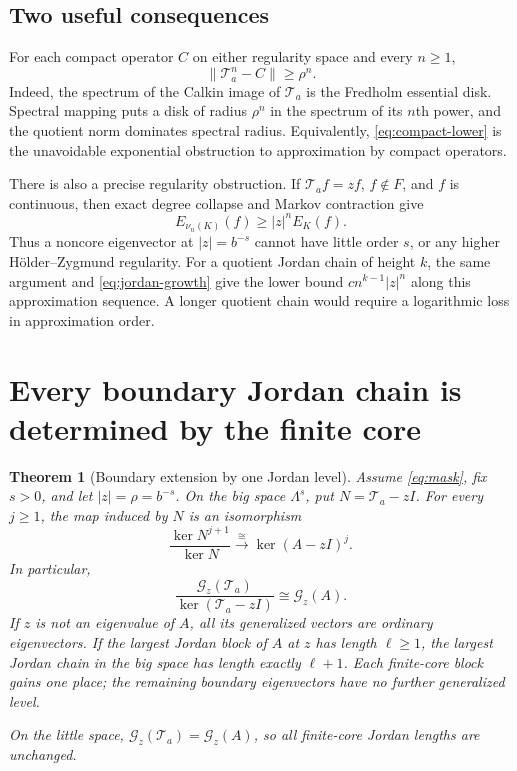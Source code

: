 \documentclass[11pt,a4paper]{article}
\numberwithin{equation}{section}
\newtheorem{theorem}{Theorem}[section]
\theoremstyle{definition}
\theoremstyle{remark}
\newcommand{\Ta}{\mathcal T_a}
\newcommand{\norm}[1]{\left\lVert#1\right\rVert}
\newcommand{\Gg}[2]{\mathcal G_{#1}(#2)}
\begin{document}
\subsection{Two useful consequences}
For each compact operator $C$ on either regularity space and every
$n\ge1$,
\begin{equation}
 \norm{\Ta^n-C}\ge\rho^n.
 \label{eq:compact-lower}
\end{equation}
Indeed, the spectrum of the Calkin image of $\Ta$ is the Fredholm
essential disk. Spectral mapping puts a disk of radius $\rho^n$ in the
spectrum of its $n$th power, and the quotient norm dominates spectral
radius. Equivalently, \eqref{eq:compact-lower} is the unavoidable
exponential obstruction to approximation by compact operators.

There is also a precise regularity obstruction. If $\Ta f=zf$,
$f\notin F$, and $f$ is continuous, then exact degree collapse and
Markov contraction give
\begin{equation}
 E_{\nu_n(K)}(f)\ge |z|^n E_K(f).
 \label{eq:sharp-approx-lower}
\end{equation}
Thus a noncore eigenvector at $|z|=b^{-s}$ cannot have little order
$s$, or any higher H\"older--Zygmund regularity. For a quotient
Jordan chain of height $k$, the same argument and
\eqref{eq:jordan-growth} give the lower bound
$c n^{k-1}|z|^n$ along this approximation sequence. A longer quotient
chain would require a logarithmic loss in approximation order.

\section{Every boundary Jordan chain is determined by the finite core}
\label{sec:jordan}

\begin{theorem}[Boundary extension by one Jordan level]
\label{thm:general-jordan}
Assume \eqref{eq:mask}, fix $s>0$, and let $|z|=\rho=b^{-s}$.
On the big space $\Lambda^s$, put $N=\Ta-zI$. For every $j\ge1$,
the map induced by $N$ is an isomorphism
\begin{equation}
 \frac{\ker N^{j+1}}{\ker N}
 \xrightarrow{\ \cong\ }\ker(A-zI)^j.
 \label{eq:root-quotients}
\end{equation}
In particular,
\begin{equation}
 \frac{\Gg z{\Ta}}{\ker(\Ta-zI)}\cong\Gg zA.
 \label{eq:root-quotient-full}
\end{equation}
If $z$ is not an eigenvalue of $A$, all its generalized vectors are
ordinary eigenvectors. If the largest Jordan block of $A$ at $z$ has
length $\ell\ge1$, the largest Jordan chain in the big space has
length exactly $\ell+1$. Each finite-core block gains one place;
the remaining boundary eigenvectors have no further generalized level.

On the little space,
$\Gg z{\Ta}=\Gg zA$, so all finite-core Jordan lengths are unchanged.
\end{theorem}
\end{document}
